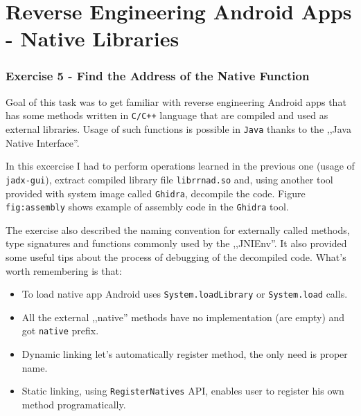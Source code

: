 \section{Reverse Engineering Android Apps - Native Libraries}


\subsubsection{Exercise 5 - Find the Address of the Native Function}
Goal of this task was to get familiar with reverse engineering Android apps that has some methods written in \texttt{C/C++} language that are compiled and used as external libraries. Usage of such functions is possible in \texttt{Java} thanks to the ,,Java Native Interface''.

In this excercise I had to perform operations learned in the previous one (usage of \texttt{jadx-gui}), extract compiled library file \texttt{librrnad.so} and, using another tool provided with system image called \texttt{Ghidra}, decompile the code. Figure \texttt{fig:assembly} shows example of assembly code in the \texttt{Ghidra} tool.

\begin{figure}[!htb]
\end{figure}

The exercise also described the naming convention for externally called methods, type signatures and functions commonly used by the ,,JNIEnv''. It also provided some useful tips about the process of debugging of the decompiled code. What's worth remembering is that:

\begin{itemize}
  \item {To load native app Android uses \texttt{System.loadLibrary} or \texttt{System.load} calls.}
  \item All the external ,,native'' methods have no implementation (are empty) and got \texttt{native} prefix.
  \item Dynamic linking let's automatically register method, the only need is proper name.
  \item Static linking, using \texttt{RegisterNatives} API, enables user to register his own method programatically.
\end{itemize}

